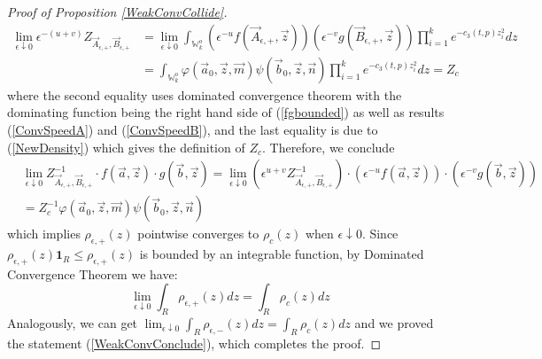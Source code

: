 \begin{proof}[Proof of Proposition \ref{WeakConvCollide}]
\begin{equation}
\begin{split}
	\lim_{\epsilon\downarrow 0}\epsilon^{-(u+v)}Z_{\vec{A}_{\epsilon,+},\vec{B}_{\epsilon,+}}&=\lim_{\epsilon\downarrow 0}\int_{\mathbb{W}_{k}^{o}}\left(\epsilon^{-u}f(\vec{A}_{\epsilon,+},\vec{z})\right)\left(\epsilon^{-v}g(\vec{B}_{\epsilon,+},\vec{z})\right)\prod_{i=1}^{k}e^{-c_{3}(t,p)z^{2}_{i}}dz\\
	&=\int_{\mathbb{W}_{k}^{o}}\varphi(\vec{a}_{0},\vec{z},\vec{m})\psi(\vec{b}_{0},\vec{z},\vec{n})\prod_{i=1}^{k}e^{-c_{3}(t,p)z^{2}_{i}}dz=Z_c
\end{split}
\end{equation}
where the second equality uses dominated convergence theorem with the dominating function being the right hand side of (\ref{fgbounded}) as well as results (\ref{ConvSpeedA}) and (\ref{ConvSpeedB}), and the last equality is due to (\ref{NewDensity}) which gives the definition of $Z_c$.
Therefore, we conclude
\begin{equation}
	\begin{split}
		& \lim_{\epsilon\downarrow 0}Z_{\vec{A}_{\epsilon,+},\vec{B}_{\epsilon,+}}^{-1}\cdot f(\vec{a},\vec{z})\cdot g(\vec{b},\vec{z})=\lim_{\epsilon\downarrow 0}\left(\epsilon^{u+v}Z_{\vec{A}_{\epsilon,+},\vec{B}_{\epsilon,+}}^{-1}\right)\cdot \left(\epsilon^{-u}f(\vec{a},\vec{z})\right)\cdot\left(\epsilon^{-v}g(\vec{b},\vec{z})\right)\\
		&=Z_{c}^{-1}\varphi(\vec{a}_{0},\vec{z},\vec{m})\psi(\vec{b}_{0},\vec{z},\vec{n})
	\end{split}
\end{equation}
which implies $\rho_{\epsilon,+}(z)$ pointwise converges to $\rho_{c}(z)$ when $\epsilon\downarrow 0$.
Since $\rho_{\epsilon,+}(z)\mathbf{1}_{R}\leq\rho_{\epsilon,+}(z)$ is bounded by an integrable function, by Dominated Convergence Theorem we have: $$\lim_{\epsilon\downarrow 0}\int_{R}\rho_{\epsilon,+}(z)dz=\int_{R}\rho_{c}(z)dz$$ Analogously, we can get $\lim_{\epsilon\downarrow 0}\int_{R}\rho_{\epsilon,-}(z)dz=\int_{R}\rho_{c}(z)dz$ and we proved the statement (\ref{WeakConvConclude}), which completes the proof.
\end{proof}
